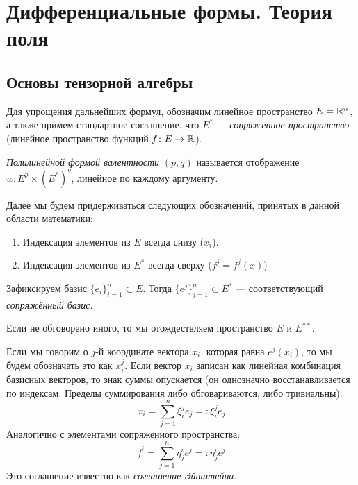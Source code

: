 \section{Дифференциальные формы. Теория поля}

\subsection{Основы тензорной алгебры}

\begin{note}
	Для упрощения дальнейших формул, обозначим линейное пространство $E = \mathbb{R}^n$, а также примем стандартное соглашение, что $E^*$ --- \textit{сопряженное пространство} (линейное пространство функций $f \colon E \to \mathbb{R}$).
\end{note}

\begin{definition}
	\textit{Полилинейной формой валентности} $(p, q)$ называется отображение $w \colon E^p \times (E^*)^q$, линейное по каждому аргументу.
\end{definition}

\begin{note}
	Далее мы будем придерживаться следующих обозначений, принятых в данной области математики:
	\begin{enumerate}
		\item Индексация элементов из $E$ всегда снизу ($x_i$).
		
		\item Индексация элементов из $E^*$ всегда сверху ($f^j = f^j(x)$)
	\end{enumerate}
\end{note}

\begin{note}
	Зафиксируем базис $\{e_i\}_{i = 1}^n \subset E$. Тогда $\{e^j\}_{j = 1}^n \subset E^*$ --- соответствующий \textit{сопряжённый базис}.
\end{note}

\begin{note}
	Если не обговорено иного, то мы отождествляем пространство $E$ и $E^{**}$.
\end{note}

\begin{note}
	Если мы говорим о $j$-й координате вектора $x_i$, которая равна $e^j(x_i)$, то мы будем обозначать это как $x_i^j$. Если вектор $x_i$ записан как линейная комбинация базисных векторов, то знак суммы опускается (он однозначно восстанавливается по индексам. Пределы суммирования либо обговариваются, либо тривиальны):
	\[
		x_i = \sum_{j = 1}^n \xi_i^j e_j =: \xi_i^j e_j
	\]
	Аналогично с элементами сопряженного пространства:
	\[
		f^i = \sum_{j = 1}^n \eta_j^i e^j =: \eta_j^i e^j
	\]
	Это соглашение известно как \textit{соглашение Эйнштейна}.
\end{note}

